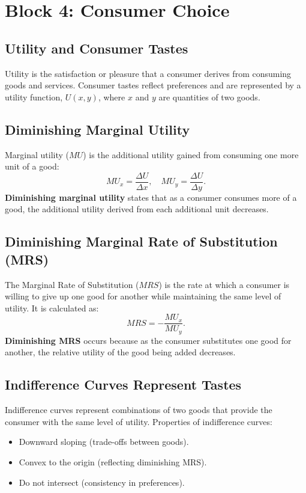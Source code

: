 \chapter*{Block 4: Consumer Choice}

\section*{Utility and Consumer Tastes}
Utility is the satisfaction or pleasure that a consumer derives from consuming goods and services. Consumer tastes reflect preferences and are represented by a utility function, \(U(x, y)\), where \(x\) and \(y\) are quantities of two goods.

\section*{Diminishing Marginal Utility}
Marginal utility (\(MU\)) is the additional utility gained from consuming one more unit of a good:
\[
MU_x = \frac{\Delta U}{\Delta x}, \quad MU_y = \frac{\Delta U}{\Delta y}.
\]
\textbf{Diminishing marginal utility} states that as a consumer consumes more of a good, the additional utility derived from each additional unit decreases.

\section*{Diminishing Marginal Rate of Substitution (MRS)}
The Marginal Rate of Substitution (\(MRS\)) is the rate at which a consumer is willing to give up one good for another while maintaining the same level of utility. It is calculated as:
\[
MRS = -\frac{MU_x}{MU_y}.
\]
\textbf{Diminishing MRS} occurs because as the consumer substitutes one good for another, the relative utility of the good being added decreases.

\section*{Indifference Curves Represent Tastes}
Indifference curves represent combinations of two goods that provide the consumer with the same level of utility. Properties of indifference curves:
\begin{itemize}
    \item Downward sloping (trade-offs between goods).
    \item Convex to the origin (reflecting diminishing MRS).
    \item Do not intersect (consistency in preferences).
\end{itemize}

